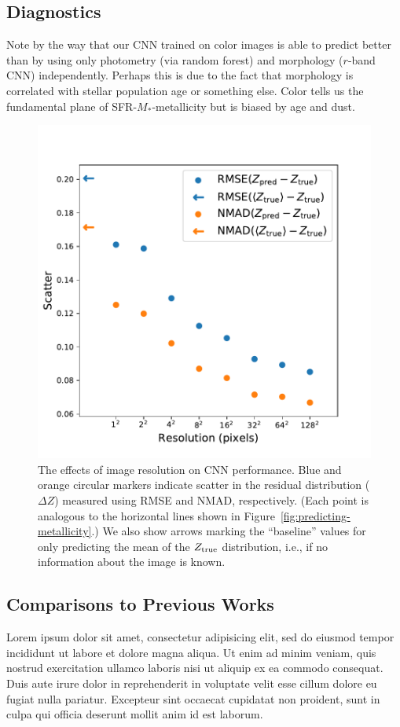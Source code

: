\documentclass[fleqn,usenatbib]{mnras}
\begin{document}
\subsection{Diagnostics}\label{sec:diagnostics}
Note by the way that our CNN trained on color images is able to predict better than by using only photometry (via random forest) and morphology ($r$-band CNN) independently.
Perhaps this is due to the fact that morphology is correlated with stellar population age or something else.
Color tells us the fundamental plane of SFR-$M_*$-metallicity but is biased by age and dust.


\begin{figure}
	\includegraphics[width=\columnwidth]{03-resolution.pdf}
	\caption{\label{fig:resolution}
		The effects of image resolution on CNN performance.
		Blue and orange circular markers indicate scatter in the residual distribution ($\Delta Z$) measured using RMSE and NMAD, respectively.
		(Each point is analogous to the horizontal lines shown in Figure~\ref{fig:predicting-metallicity}.)
		We also show arrows marking the ``baseline'' values for only predicting the mean of the $Z_{\rm true}$ distribution, i.e., if no information about the image is known.
		}
\end{figure}

\subsection{Comparisons to Previous Works}\label{sec:previous work}
Lorem ipsum dolor sit amet, consectetur adipisicing elit, sed do eiusmod tempor incididunt ut labore et dolore magna aliqua. Ut enim ad minim veniam, quis nostrud exercitation ullamco laboris nisi ut aliquip ex ea commodo consequat. Duis aute irure dolor in reprehenderit in voluptate velit esse cillum dolore eu fugiat nulla pariatur. Excepteur sint occaecat cupidatat non proident, sunt in culpa qui officia deserunt mollit anim id est laborum.
\end{document}
